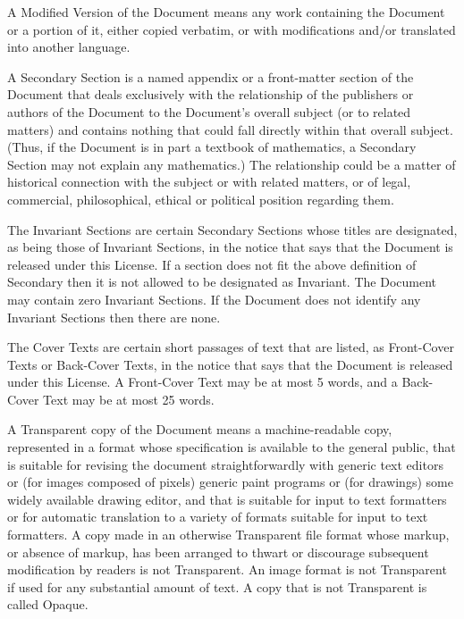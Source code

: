 \begin{BookLicense}
A \BookQuoteChar{}Modified Version\BookQuoteChar{} of the Document means any work containing the Document or a portion of it, either copied verbatim, or with modifications and/or translated into another language.

A \BookQuoteChar{}Secondary Section\BookQuoteChar{} is a named appendix or a front-matter section of the Document that deals exclusively with the relationship of the publishers or authors of the Document to the Document's overall subject (or to related matters) and contains nothing that could fall directly within that overall subject. (Thus, if the Document is in part a textbook of mathematics, a Secondary Section may not explain any mathematics.) The relationship could be a matter of historical connection with the subject or with related matters, or of legal, commercial, philosophical, ethical or political position regarding them.

The \BookQuoteChar{}Invariant Sections\BookQuoteChar{} are certain Secondary Sections whose titles are designated, as being those of Invariant Sections, in the notice that says that the Document is released under this License. If a section does not fit the above definition of Secondary then it is not allowed to be designated as Invariant. The Document may contain zero Invariant Sections. If the Document does not identify any Invariant Sections then there are none.

The \BookQuoteChar{}Cover Texts\BookQuoteChar{} are certain short passages of text that are listed, as Front-Cover Texts or Back-Cover Texts, in the notice that says that the Document is released under this License. A Front-Cover Text may be at most 5 words, and a Back-Cover Text may be at most 25 words.

A \BookQuoteChar{}Transparent\BookQuoteChar{} copy of the Document means a machine-readable copy, represented in a format whose specification is available to the general public, that is suitable for revising the document straightforwardly with generic text editors or (for images composed of pixels) generic paint programs or (for drawings) some widely available drawing editor, and that is suitable for input to text formatters or for automatic translation to a variety of formats suitable for input to text formatters. A copy made in an otherwise Transparent file format whose markup, or absence of markup, has been arranged to thwart or discourage subsequent modification by readers is not Transparent. An image format is not Transparent if used for any substantial amount of text. A copy that is not \BookQuoteChar{}Transparent\BookQuoteChar{} is called \BookQuoteChar{}Opaque\BookQuoteChar{}.


\end{BookLicense}
